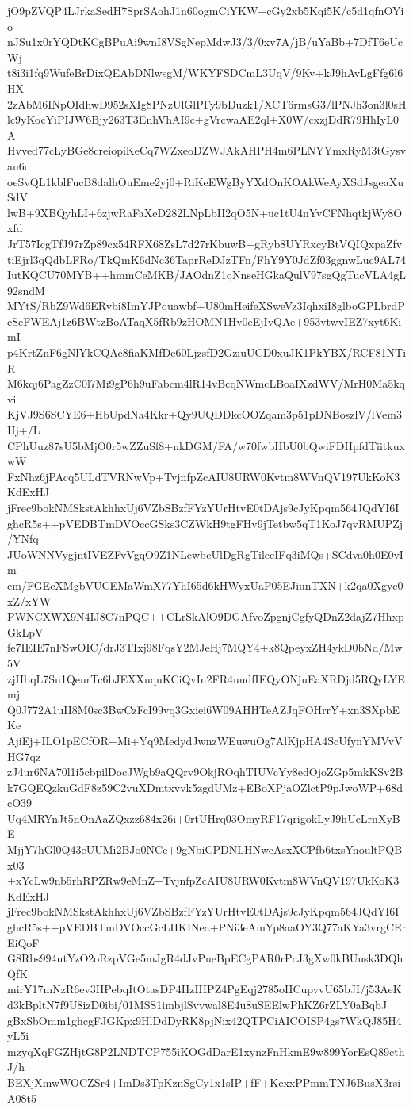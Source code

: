jO9pZVQP4LJrkaSedH7SprSAohJ1n60ogmCiYKW+cGy2xb5Kqi5K/c5d1qfnOYio
nJSu1x0rYQDtKCgBPuAi9wnI8VSgNepMdwJ3/3/0xv7A/jB/uYaBb+7DfT6eUcWj
t8i3i1fq9WufeBrDixQEAbDNlwsgM/WKYFSDCmL3UqV/9Kv+kJ9hAvLgFfg6l6HX
2zAbM6INpOIdhwD952sXIg8PNzUlGlPFy9bDuzk1/XCT6rmsG3/lPNJh3on3l0sH
lc9yKocYiPIJW6Bjy263T3EnhVhAI9c+gVrcwaAE2ql+X0W/cxzjDdR79HhIyL0A
Hvved77cLyBGe8creiopiKeCq7WZxeoDZWJAkAHPH4m6PLNYYmxRyM3tGysvau6d
oeSvQL1kblFucB8dalhOuEme2yj0+RiKeEWgByYXdOnKOAkWeAyXSdJsgeaXuSdV
lwB+9XBQyhLI+6zjwRaFaXeD282LNpLbII2qO5N+uc1tU4nYvCFNhqtkjWy8Oxfd
JrT57IcgTfJ97rZp89cx54RFX68ZsL7d27rKbuwB+gRyb8UYRxcyBtVQIQxpaZfv
tiEjrl3qQdbLFRo/TkQmK6dNc36TaprReDJzTFn/FhY9Y0JdZf03ggnwLuc9AL74
IutKQCU70MYB++hmmCeMKB/JAOdnZ1qNnseHGkaQulV97sgQgTucVLA4gL92sndM
MYtS/RbZ9Wd6ERvbi8ImYJPquawbf+U80mHeifeXSweVz3IqhxiI8glboGPLbrdP
cSeFWEAj1z6BWtzBoATaqX5fRb9zHOMN1Hv0eEjIvQAe+953vtwvIEZ7xyt6KimI
p4KrtZnF6gNlYkCQAc8fiaKMfDe60LjzsfD2GziuUCD0xuJK1PkYBX/RCF81NTiR
M6kqj6PagZzC0l7Mi9gP6h9uFabcm4lR14vBcqNWmcLBoaIXzdWV/MrH0Ma5kqvi
KjVJ9S6SCYE6+HbUpdNa4Kkr+Qy9UQDDkcOOZqam3p51pDNBoszlV/lVem3Hj+/L
CPhUuz87sU5bMjO0r5wZZuSf8+nkDGM/FA/w70fwbHbU0bQwiFDHpfdTiitkuxwW
FxNhz6jPAcq5ULdTVRNwVp+TvjnfpZcAIU8URW0Kvtm8WVnQV197UkKoK3KdExHJ
jFrec9bokNMSkstAkhhxUj6VZbSBzfFYzYUrHtvE0tDAjs9cJyKpqm564JQdYI6I
ghcR5s++pVEDBTmDVOccGSks3CZWkH9tgFHv9jTetbw5qT1KoJ7qvRMUPZj/YNfq
JUoWNNVygjntIVEZFvVgqO9Z1NLcwbeUlDgRgTilecIFq3iMQs+SCdva0h0E0vIm
cm/FGEcXMgbVUCEMaWmX77YhI65d6kHWyxUaP05EJiunTXN+k2qa0Xgyc0xZ/xYW
PWNCXWX9N4IJ8C7nPQC++CLrSkAlO9DGAfvoZpgnjCgfyQDnZ2dajZ7HhxpGkLpV
fe7IEIE7nFSwOIC/drJ3TIxj98FqsY2MJeHj7MQY4+k8QpeyxZH4ykD0bNd/Mw5V
zjHbqL7Su1QeurTc6bJEXXuquKCiQvIn2FR4uudfIEQyONjuEaXRDjd5RQyLYEmj
Q0J772A1uII8M0sc3BwCzFcI99vq3Gxiei6W09AHHTeAZJqFOHrrY+xn3SXpbEKe
AjiEj+ILO1pECfOR+Mi+Yq9MedydJwnzWEuwuOg7AlKjpHA4ScUfynYMVvVHG7qz
zJ4ur6NA70l1i5cbpilDocJWgb9aQQrv9OkjROqhTIUVcYy8edOjoZGp5mkKSv2B
k7GQEQzkuGdF8z59C2vuXDmtxvvk5zgdUMz+EBoXPjaOZlctP9pJwoWP+68dcO39
Uq4MRYnJt5nOnAaZQxzz684x26i+0rtUHrq03OmyRF17qrigokLyJ9hUeLrnXyBE
MjjY7hGl0Q43eUUMi2BJo0NCe+9gNbiCPDNLHNwcAsxXCPfb6txsYnoultPQBx03
+xYcLw9nb5rhRPZRw9eMnZ+TvjnfpZcAIU8URW0Kvtm8WVnQV197UkKoK3KdExHJ
jFrec9bokNMSkstAkhhxUj6VZbSBzfFYzYUrHtvE0tDAjs9cJyKpqm564JQdYI6I
ghcR5s++pVEDBTmDVOccGcLHKINea+PNi3eAmYp8aaOY3Q77aKYa3vrgCErEiQoF
G8Rbs994utYzO2oRzpVGe5mJgR4dJvPueBpECgPAR0rPcJ3gXw0kBUusk3DQhQfK
mirY17mNzR6ev3HPebqItOtasDP4HzIHPZ4PgEqj2785oHCupvvU65bJI/j53AeK
d3kBpltN7f9U8izD0ibi/01MSS1imbjlSvvwal8E4u8uSEElwPhKZ6rZLY0aBqbJ
gBxSbOmm1ghcgFJGKpx9HlDdDyRK8pjNix42QTPCiAICOISP4gs7WkQJ85H4yL5i
mzyqXqFGZHjtG8P2LNDTCP755iKOGdDarE1xynzFnHkmE9w899YorEsQ89cthJ/h
BEXjXmwWOCZSr4+ImDs3TpKznSgCy1x1sIP+fF+KcxxPPmmTNJ6BusX3rsiA08t5
